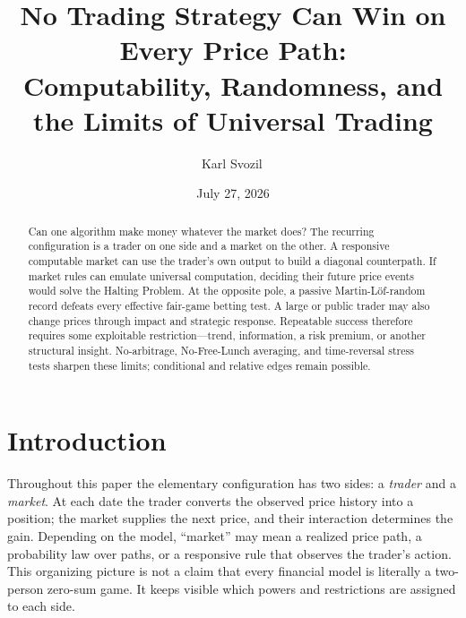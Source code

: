 \documentclass[aps,pra,reprint,superscriptaddress,amsmath,amssymb,floatfix]{revtex4-2}
\theoremstyle{plain}
\theoremstyle{definition}
\theoremstyle{remark}
\begin{document}
\title{No Trading Strategy Can Win on Every Price Path:\\
Computability, Randomness, and the Limits of Universal Trading}

\author{Karl Svozil\,}

\date{July 27, 2026}

\begin{abstract}
Can one algorithm make money whatever the market does? The recurring
configuration is a trader on one side and a market on the other. A responsive
computable market can use the trader's own output to build a diagonal
counterpath. If market rules can emulate universal computation, deciding
their future price events would solve the Halting Problem. At the opposite
pole, a passive Martin-L\"of-random record defeats every effective fair-game
betting test. A large or public trader may also change prices through impact
and strategic response. Repeatable success therefore requires some
exploitable restriction---trend, information, a risk premium, or another
structural insight. No-arbitrage, No-Free-Lunch averaging, and time-reversal
stress tests sharpen these limits; conditional and relative edges remain
possible.
\end{abstract}

\maketitle

\section{Introduction}
\label{sec:intro}

Throughout this paper the elementary configuration has two sides: a
\emph{trader} and a \emph{market}. At each date the trader converts the
observed price history into a position; the market supplies the next price,
and their interaction determines the gain. Depending on the model, ``market''
may mean a realized price path, a probability law over paths, or a responsive
rule that observes the trader's action. This organizing picture is not a claim
that every financial model is literally a two-person zero-sum game. It keeps
visible which powers and restrictions are assigned to each side.
\end{document}
